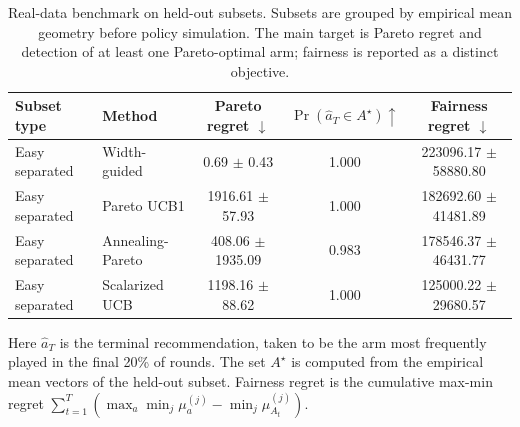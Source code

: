 \begin{table}[t]
\centering
\caption{Real-data benchmark on held-out subsets. Subsets are grouped by empirical mean geometry before policy simulation. The main target is Pareto regret and detection of at least one Pareto-optimal arm; fairness is reported as a distinct objective.}
\label{tab:real-main}
\scriptsize
\setlength{\tabcolsep}{3pt}
\begin{tabular}{llccc}
\toprule
Subset type & Method & Pareto regret $\downarrow$ & $\Pr(\widehat a_T\in A^\star)\uparrow$ & Fairness regret $\downarrow$ \\
\midrule
Easy separated & Width-guided & 0.69 $\pm$ 0.43 & 1.000 & 223096.17 $\pm$ 58880.80 \\
Easy separated & Pareto UCB1 & 1916.61 $\pm$ 57.93 & 1.000 & 182692.60 $\pm$ 41481.89 \\
Easy separated & Annealing-Pareto & 408.06 $\pm$ 1935.09 & 0.983 & 178546.37 $\pm$ 46431.77 \\
Easy separated & Scalarized UCB & 1198.16 $\pm$ 88.62 & 1.000 & 125000.22 $\pm$ 29680.57 \\
\bottomrule
\end{tabular}
\vspace{2pt}
\begin{minipage}{0.98\linewidth}
\scriptsize
Here $\widehat a_T$ is the terminal recommendation, taken to be the arm most frequently played in the final 20\% of rounds. The set $A^\star$ is computed from the empirical mean vectors of the held-out subset. Fairness regret is the cumulative max-min regret $\sum_{t=1}^T (\max_a \min_j \mu_a^{(j)} - \min_j \mu_{A_t}^{(j)})$.
\end{minipage}
\end{table}
